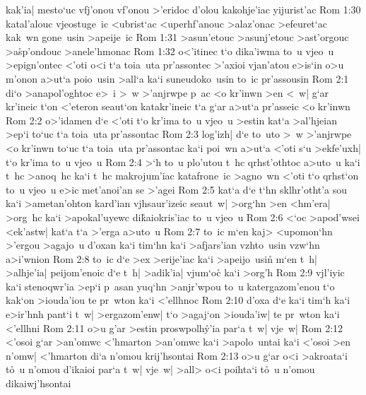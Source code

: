 kak'ia|
mesto`uc
vfj'onou
vf'onou
>'eridoc
d'olou
kakohje'iac
yijurist'ac\bibvsend
\vs Rom 1:30
katal'alouc
vjeostuge~ic
<ubrist`ac
<uperhf'anouc
>alaz'onac
>efeuret`ac
kak~wn
gone~usin
>apeije~ic\bibvsend
\vs Rom 1:31
>asun'etouc
>asunj'etouc
>ast'orgouc
>a\r{s}p'ondouc
>anele'hmonac\bibvsend
\vs Rom 1:32
o<'itinec
t`o
dika'iwma
to~u
vjeo~u
>epign'ontec
<'oti
o<i
t`a
toia~uta
pr'assontec
>'axioi
vjan'atou
e>is`in
o>u
m'onon
a>ut`a
poio~usin
>all`a
ka`i
suneudoko~usin
to~ic
pr'assousin\bibvsend
\vs Rom 2:1
di`o
>anapol'oghtoc
e>~i
>~w
>'anjrwpe
p~ac
<o
kr'inwn
>en
<~w|
g`ar
kr'ineic
t`on
<'eteron
seaut`on
katakr'ineic
t`a
g`ar
a>ut`a
pr'asseic
<o
kr'inwn\bibvsend
\vs Rom 2:2
o>'idamen
d`e
<'oti
t`o
kr'ima
to~u
vjeo~u
>estin
kat`a
>al'hjeian
>ep`i
to`uc
t`a
toia~uta
pr'assontac\bibvsend
\vs Rom 2:3
log'izh|
d`e
to~uto
>~w
>'anjrwpe
<o
kr'inwn
to`uc
t`a
toia~uta
pr'assontac
ka`i
poi~wn
a>ut`a
<'oti
s`u
>ekfe'uxh|
t`o
kr'ima
to~u
vjeo~u\bibvsend
\vs Rom 2:4
>`h
to~u
plo'utou
t~hc
qrhst'othtoc
a>uto~u
ka`i
t~hc
>anoq~hc
ka`i
t~hc
makrojum'iac
katafrone~ic
>agno~wn
<'oti
t`o
qrhst`on
to~u
vjeo~u
e>ic
met'anoi'an
se
>'agei\bibvsend
\vs Rom 2:5
kat`a
d`e
t`hn
sklhr'otht'a
sou
ka`i
>ametan'ohton
kard'ian
vjhsaur'izeic
seaut~w|
>org`hn
>en
<hm'era|
>org~hc
ka`i
>apokal'uyewc
di\r{k}aiokris'iac
to~u
vjeo~u\bibvsend
\vs Rom 2:6
<`oc
>apod'wsei
<ek'astw|
kat`a
t`a
>'erga
a>uto~u\bibvsend
\vs Rom 2:7
to~ic
m`en
kaj>
<upomon`hn
>'ergou
>agajo~u
d'oxan
ka`i
tim`hn
ka`i
>afjars'ian
vzhto~usin
vzw`hn
a>i'wnion\bibvsend
\vs Rom 2:8
to~ic
d`e
>ex
>erije'iac
ka`i
>apeijo~usi\r{n}
m`en
t~h|
>alhje'ia|
peijom'enoic
d`e
t~h|
>adik'ia|
vjum`oc\r{}
ka`i
>org'h\bibvsend
\vs Rom 2:9
vjl'iyic
ka`i
stenoqwr'ia
>ep`i
p~asan
yuq`hn
>anjr'wpou
to~u
katergazom'enou
t`o
kak`on
>iouda'iou
te
pr~wton
ka`i
<'ellhnoc\bibvsend
\vs Rom 2:10
d'oxa
d`e
ka`i
tim`h
ka`i
e>ir'hnh
pant`i
t~w|
>ergazom'enw|
t`o
>agaj`on
>iouda'iw|
te
pr~wton
ka`i
<'ellhni\bibvsend
\vs Rom 2:11
o>u
g'ar
>estin
proswpolh\r{y}'ia
par`a
t~w|
vje~w|\bibvsend
\vs Rom 2:12
<'osoi
g`ar
>an'omwc
<'hmarton
>an'omwc
ka`i
>apolo~untai
ka`i
<'osoi
>en
n'omw|
<'hmarton
di`a
n'omou
krij'hsontai\bibvsend
\vs Rom 2:13
o>u
g`ar
o<i
>akroata`i
t\r{o}~u
n'omou
d'ikaioi
par`a
t~w|
vje~w|
>all>
o<i
poihta`i
t\r{o}~u
n'omou
dikaiwj'hsontai\bibvsend
